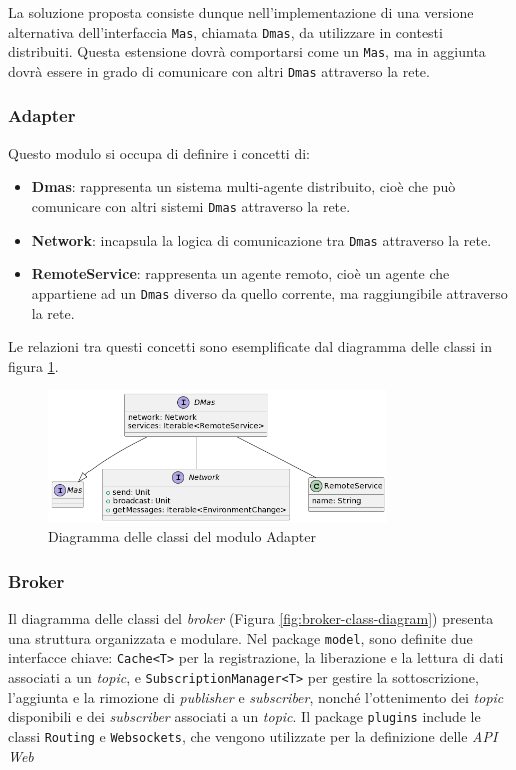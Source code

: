 La soluzione proposta consiste dunque nell'implementazione di una versione alternativa dell'interfaccia \texttt{Mas}, chiamata \texttt{Dmas}, da utilizzare in contesti distribuiti.
Questa estensione dovrà comportarsi come un \texttt{Mas}, ma in aggiunta dovrà essere in grado di comunicare con altri \texttt{Dmas} attraverso la rete.

\subsubsection{Adapter}
Questo modulo si occupa di definire i concetti di:

\begin{itemize}
    \item \textbf{Dmas}: rappresenta un sistema multi-agente distribuito, cioè che può comunicare con altri sistemi \texttt{Dmas} attraverso la rete.
    \item \textbf{Network}: incapsula la logica di comunicazione tra \texttt{Dmas} attraverso la rete.
    \item \textbf{RemoteService}: rappresenta un agente remoto, cioè un agente che appartiene ad un \texttt{Dmas} diverso da quello corrente, ma raggiungibile attraverso la rete.
\end{itemize}

Le relazioni tra questi concetti sono esemplificate dal diagramma delle classi in figura \ref{fig:class-dmas}.

\begin{figure}[ht!]
    \centering
    \includegraphics[width=0.8\textwidth]{figures/class-dmas.png}
    \caption{Diagramma delle classi del modulo Adapter}
    \label{fig:class-dmas}
\end{figure}

\subsubsection{Broker}

Il diagramma delle classi del \textit{broker} (Figura \ref{fig:broker-class-diagram}) presenta una struttura organizzata e modulare. Nel package \texttt{model}, sono definite due interfacce chiave: \texttt{Cache<T>} per la registrazione, la liberazione e la lettura di dati associati a un \textit{topic}, e \texttt{SubscriptionManager<T>} per gestire la sottoscrizione, l'aggiunta e la rimozione di \textit{publisher} e \textit{subscriber}, nonché l'ottenimento dei \textit{topic} disponibili e dei \textit{subscriber} associati a un \textit{topic}. Il package \texttt{plugins} include le classi \texttt{Routing} e \texttt{Websockets}, che vengono utilizzate per la definizione delle \textit{API Web}

